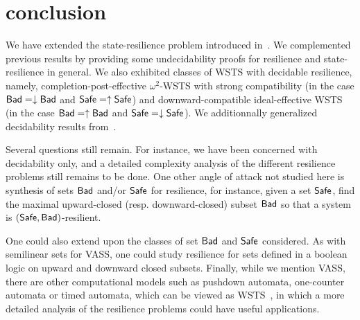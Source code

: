 



\section{conclusion}


We have extended the state-resilience problem introduced in~\cite{DBLP:journals/corr/abs-2108-00889,DBLP:conf/gg/Ozkan22}.
We complemented previous results by providing some undecidability proofs for resilience and state-resilience in general. We also exhibited classes of WSTS with decidable resilience, namely, 
completion-post-effective $\omega^2$-WSTS with strong compatibility (in the case $\textsf{Bad} = \downarrow \textsf{Bad}$ and $\textsf{Safe} = \uparrow \textsf{Safe}$) and 
downward-compatible
ideal-effective WSTS
(in the case $\textsf{Bad} = \uparrow \textsf{Bad}$ and $\textsf{Safe} = \downarrow \textsf{Safe}$).
We additionnally generalized decidability results from~\cite{DBLP:journals/corr/abs-2108-00889,DBLP:conf/gg/Ozkan22}.

Several questions still remain.
For instance, we have been concerned with decidability only, and a detailed complexity analysis of the different resilience problems still remains to be done. 
One other angle of attack not studied here is synthesis of sets $\textsf{Bad}$ and/or $\textsf{Safe}$ for resilience,
for instance, given a set $\textsf{Safe}$, find the maximal upward-closed (resp. downward-closed) subset 
$\textsf{Bad}$ so that a system is $(\textsf{Safe},\textsf{Bad})$-resilient. 

One could also extend upon the classes of set $\textsf{Bad}$ and $\textsf{Safe}$ considered. As with semilinear sets for VASS, one could study resilience for sets defined in a boolean logic on upward and downward closed subsets. Finally, while we mention VASS, there are other computational models such as pushdown automata, one-counter automata or timed automata, which can be viewed as WSTS~\cite{DBLP:journals/tcs/FinkelS01}, in which a more detailed analysis of the resilience problems could have useful applications.


%
%
%
%


